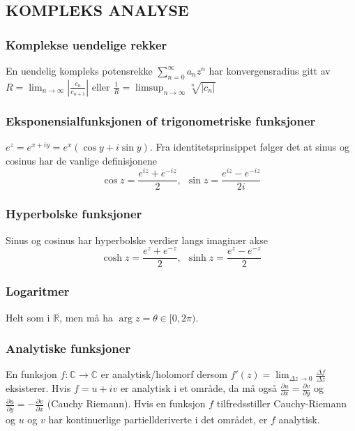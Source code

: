 \documentclass[a4paper, norsk, 8pt]{article}
\newcommand{\PAR}[2]{ \frac{\partial #1}{\partial #2}}
\begin{document}
\footnotesize
\begin{multicols*}{2}

\subsection*{\footnotesize KOMPLEKS ANALYSE }
\subsubsection*{\small Komplekse uendelige rekker}
En uendelig kompleks potensrekke $\sum_{n=0}^{\infty}a_nz^n$ har konvergensradius gitt av $R=\lim_{n\rightarrow\infty}\left|\frac{c_n}{c_{n+1}}\right|$ eller $\frac{1}{R}=\limsup_{n\rightarrow\infty}\sqrt[n]{|c_n|}$

\subsubsection*{\small Eksponensialfunksjonen of trigonometriske funksjoner}
$e^{z}=e^{x+iy}=e^{x}\left(\cos y+i\sin y\right)$. Fra identitetsprinsippet følger det at sinus og cosinus har de vanlige definisjonene
\[ \cos z = \frac{e^{iz}+e^{-iz}}{2}, \ \ \sin{z}=\frac{e^{iz}-e^{-iz}}{2i} \]

\subsubsection*{\small Hyperbolske funksjoner}
Sinus og cosinus har hyperbolske verdier langs imaginær akse
\[ \cosh z = \frac{e^{z}+e^{-z}}{2}, \ \ \sinh{z}=\frac{e^{z}-e^{-z}}{2} \]

\subsubsection*{\small Logaritmer}
Helt som i $\mathbb{R}$, men må ha $\arg{z}=\theta\in[0,2\pi)$.

\subsubsection*{\small Analytiske funksjoner}
En funksjon $f:\mathbb{C}\rightarrow\mathbb{C}$ er analytisk/holomorf dersom $f'(z)=\lim_{\Delta z \rightarrow 0}\frac{\Delta f}{\Delta z}$ eksisterer. Hvis $f=u+iv$ er analytisk i et område, da må også $\PAR{u}{x}=\PAR{v}{y}$ og $\PAR{u}{y}=-\PAR{v}{x}$ (Cauchy Riemann). Hvis en funksjon $f$ tilfredsstiller Cauchy-Riemann og $u$ og $v$ har kontinuerlige partiellderiverte i det området, er $f$ analytisk.


\end{multicols*}
\end{document}
